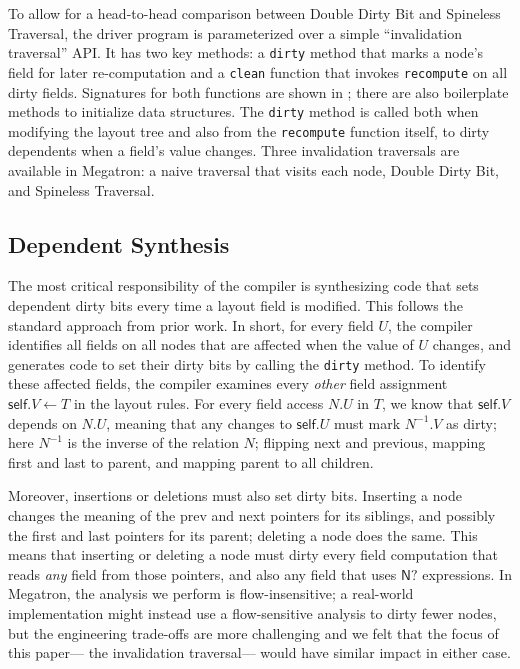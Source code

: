 To allow for a head-to-head comparison
  between Double Dirty Bit and Spineless Traversal,
  the driver program is parameterized over
  a simple ``invalidation traversal'' API.
It has two key methods:
  a \texttt{dirty} method
  that marks a node's field for later re-computation
  and a \texttt{clean} function
  that invokes \texttt{recompute} on all dirty fields.
Signatures for both functions are shown
  in ;
  there are also boilerplate methods
  to initialize data structures.
The \texttt{dirty} method is called
  both when modifying the layout tree
  and also from the \texttt{recompute} function itself,
  to dirty dependents when a field's value changes.
Three invalidation traversals are available in Megatron:
  a naive traversal that visits each node,
  Double Dirty Bit, and Spineless Traversal.

\subsection{Dependent Synthesis}

The most critical responsibility of the compiler
  is synthesizing code that sets dependent dirty bits
  every time a layout field is modified.
This follows the standard approach from prior work.
In short, for every field $U$,
  the compiler identifies all fields on all nodes
  that are affected when the value of $U$ changes,
  and generates code to set their dirty bits
  by calling the \texttt{dirty} method.
To identify these affected fields,
  the compiler examines every \emph{other} field assignment
  $\mathsf{self}.V \gets T$ in the layout rules.
For every field access $N.U$ in $T$,
  we know that $\mathsf{self}.V$ depends on $N.U$,
  meaning that any changes to $\mathsf{self}.U$
  must mark $N^{-1}.V$ as dirty;
  here $N^{-1}$ is the inverse of the relation $N$;
  flipping \textsf{next} and \textsf{previous},
  mapping \textsf{first} and \textsf{last} to \textsf{parent},
  and mapping \textsf{parent} to all children.

Moreover, insertions or deletions must also set dirty bits.
Inserting a node changes the meaning
  of the \textsf{prev} and \textsf{next} pointers
  for its siblings, and possibly
  the \textsf{first} and \textsf{last} pointers
  for its parent;
  deleting a node does the same.
This means that inserting or deleting a node
  must dirty every field computation
  that reads \emph{any} field from those pointers,
  and also any field that uses $\mathsf{N?}$ expressions.
In Megatron, the analysis we perform is flow-insensitive;
  a real-world implementation might instead use
  a flow-sensitive analysis to dirty fewer nodes,
  but the engineering trade-offs are more challenging
  and we felt that the focus of this paper---%
  the invalidation traversal---%
  would have similar impact in either case.

